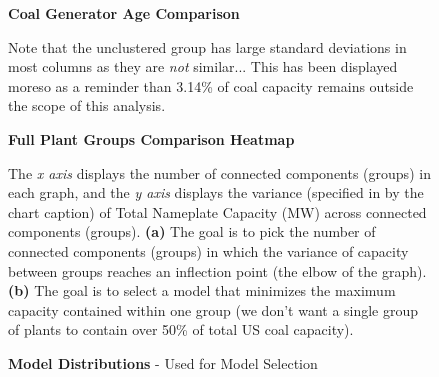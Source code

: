 \begin{figure}[htb]
    \centering
    
    
    \caption{\textbf{Coal Generator Age Comparison}}
    \medskip
    \footnotesize

    \smallskip  
    

    \label{fig:gen-ages}
\end{figure}

\begin{figure}[htb]
    \centering
      
    \caption{\textbf{Full Plant Groups Comparison Heatmap}}
    \medskip
    \footnotesize

    \smallskip  
    
    Note that the unclustered group has large standard deviations in most columns as they are \textit{not} similar... This has been displayed moreso as a reminder than 3.14\% of coal 
    capacity remains outside the scope of this analysis.

    \label{fig:heatmap-SIs}
\end{figure}

\begin{figure}[htb]
    \centering

    \begin{minipage}{0.95\textwidth}
        
    \end{minipage}

    \begin{minipage}{0.95\textwidth}
        
    \end{minipage}%
    
    \caption{\textbf{Model Distributions} - Used for Model Selection}
    \medskip
    \footnotesize

    \smallskip  
    
    The \textit{x axis} displays the number of connected components (groups) in each graph, and the \textit{y axis} displays the variance (specified in by the chart caption) of Total Nameplate Capacity (MW) across connected components (groups).
    \textbf{(a)} The goal is to pick the number of connected components (groups) in which the variance of capacity between groups reaches an inflection point (the elbow of the graph).
    \textbf{(b)} The goal is to select a model that minimizes the maximum capacity contained within one group (we don't want a single group of plants to contain over 50\% of total US coal capacity).

    \label{fig:run-measures}
\end{figure}



